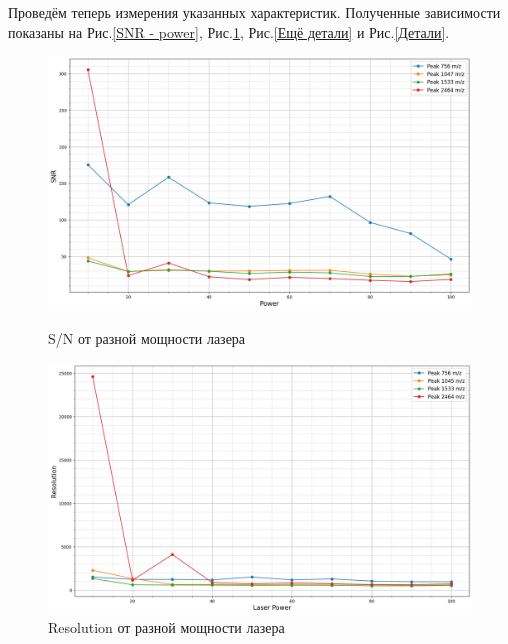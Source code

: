 \documentclass{article}
\begin{document}
Проведём теперь измерения указанных характеристик. Полученные зависимости показаны на Рис.\ref{SNR - power}, Рис.\ref{Re - power}, Рис.\ref{Ещё детали} и Рис.\ref{Детали}.

\begin{figure}[h!] 
        \centering
        \centering
            \includegraphics[width=0.9\linewidth]{Images/SNR_power_linear.png}
                 \caption{S/N от разной мощности лазера}
                 \label{SNR - power}
        \endminipage\hfill
        \centering
             \includegraphics[width=0.9\linewidth]{Images/Resolution_power_linear.png}
                 \caption{Resolution от разной мощности лазера}
                 \label{Re - power}
        \endminipage
\end{figure}
\end{document}
